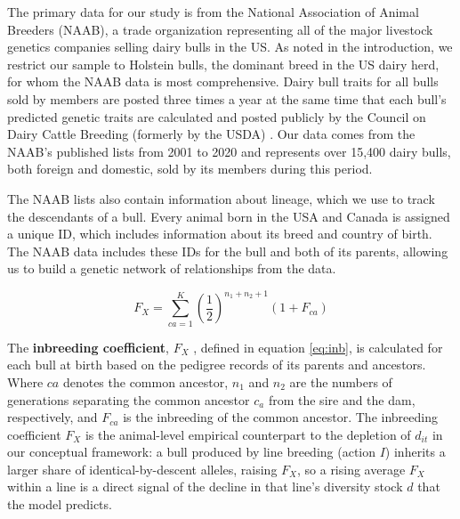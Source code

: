\documentclass[12pt,letterpaper]{article}
\begin{document}
The primary data for our study is from the National Association of Animal Breeders (NAAB), a trade organization representing all of the major livestock genetics companies selling dairy bulls in the US. As noted in the introduction, we restrict our sample to Holstein bulls, the dominant breed in the US dairy herd, for whom the NAAB data is most comprehensive. Dairy bull traits for all bulls sold by members are posted three times a year at the same time that each bull's predicted genetic traits are calculated and posted publicly by the Council on Dairy Cattle Breeding (formerly by the USDA) \citep{Hutchins_Hueth2023}. Our data comes from the NAAB's published lists from 2001 to 2020 and represents over 15,400 dairy bulls, both foreign and domestic, sold by its members during this period. %

The NAAB lists also contain information about lineage, which we use to track the descendants of a bull. Every animal born in the USA and Canada is assigned a unique ID, which includes information about its breed and country of birth. 
The NAAB data includes these IDs for the bull and both of its parents, allowing us to build a genetic network of relationships from the data. 

\begin{equation}
        F_{X}=\sum_{ca=1}^{K}\left(\dfrac{1}{2}\right)^{n_{1}+n_{2}+1}(1+F_{ca})\label{eq:inb}
\end{equation}

The \textbf{inbreeding coefficient}, $F_{X}$ \citep{Wright1922}, defined in equation \ref{eq:inb}, is calculated for each bull at birth based on the pedigree records of its parents and ancestors. Where $ca$ denotes the common ancestor, $n_{1}$ and $n_{2}$ are the numbers of generations separating the common ancestor $c_a$ from the sire and the dam, respectively, and $F_{ca}$ is the inbreeding of the common ancestor. The inbreeding coefficient $F_{X}$ is the animal-level empirical counterpart to the depletion of $d_{it}$ in our conceptual framework: a bull produced by line breeding (action $I$) inherits a larger share of identical-by-descent alleles, raising $F_{X}$, so a rising average $F_{X}$ within a line is a direct signal of the decline in that line's diversity stock $d$ that the model predicts.
\end{document}
